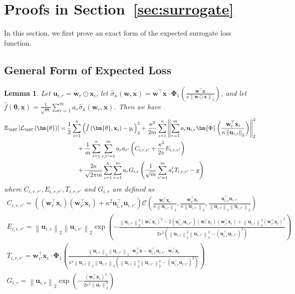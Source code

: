 \documentclass[10pt]{article} %
\newtheorem{lemma}[theorem]{Lemma}
\theoremstyle{definition}
\theoremstyle{plain}
\newcommand{\paren}[1]{\left(#1\right)}
\newcommand{\norm}[1]{\left\|#1\right\|}
\newcommand{\act}[2]{\hat{\sigma}_{\kappa}\paren{#1,#2}}
\providecommand{\E}{\mathbb{E}}
\def\calL{{\mathcal{L}}}
\def\bfu{{\mathbf{u}}}\def\bfv{{\mathbf{v}}}\def\bfw{{\mathbf{w}}}\def\bfx{{\mathbf{x}}}
\begin{document}
\section{Proofs in Section~\ref{sec:surrogate}}
In this section, we first prove an exact form of the expected surrogate loss function.
\subsection{General Form of Expected Loss}
\begin{lemma}
    \label{lem:exp_loss}
    Let $\bfu_{i,r} = \bfw_r\odot\bfx_i$, let $\act{\bfw}{\bfx} = \bfw^\top\bfx\cdot\bm{\Phi}_1\paren{\frac{\bfw^\top\bfx}{\kappa\norm{\bfw\odot\bfx}_2}}$, and let $\hat{f}\paren{\bm{\theta},\bfx} = \frac{1}{\sqrt{m}}\sum_{r=1}^ma_r\act{\bfw_r}{\bfx}$. Then we have
    \begin{align*}
        \E_{\bfC}\left[\calL_{\bfC}\paren{\bm{\theta}}\right] & = \frac{1}{2}\sum_{i=1}^n\paren{\hat{f}\paren{\bm{\theta},\bfx_i}-y_i}_2^2 + \frac{\kappa^2}{2m}\sum_{i=1}^n\norm{\sum_{r=1}^ma_r\bfu_{i,r}\bm{\Phi}\paren{\frac{\bfw_r^\top\bfx_i}{\kappa\norm{\bfu_{i,r}}_2}}}_2^2\\
        & \quad\quad\quad + \frac{1}{m}\sum_{i=1}^n\sum_{r,r'=1}^ma_ra_{r'}\paren{C_{i,r,r'} + \frac{\kappa^2}{2\pi}E_{i,r,r'}}\\
        & \quad\quad\quad + \frac{2\kappa}{\sqrt{2\pi m}}\sum_{i=1}^n\sum_{r=1}^ma_rG_{i,r}\paren{\frac{1}{\sqrt{m}}\sum_{r'=1}^ma_r'T_{i,r,r'} - y}
    \end{align*}
    where $C_{i,r,r'}, E_{i,r,r'}, T_{i,r,r'}$ and $G_{i,r}$ are defined as
    \begin{gather*}
        C_{i,r,r'} = \paren{\paren{\bfw_r^\top\bfx_i}\paren{\bfw_{r'}^\top\bfx_i} + \kappa^2\bfu_{i,r}^\top\bfu_{i,r'}}\mathcal{C}\paren{\frac{\bfw_r^\top\bfx_i}{\kappa\norm{\bfu_{i,r}}_2},\frac{\bfw_{r'}^\top\bfx_i}{\kappa\norm{\bfu_{i,r'}}_2},\frac{\bfu_{i,r}^\top\bfu_{i,r'}}{\norm{\bfu_{i,r}}_2\norm{\bfu_{i,r'}}_2}}\\
        E_{i,r,r'} = \norm{\bfu_{i,r}}_2\norm{\bfu_{i,r'}}_2\exp\paren{-\frac{\norm{\bfu_{i,r'}}_2^2\paren{\bfw_r^\top\bfx_i}^2-2\paren{\bfu_{i,r}^\top\bfu_{i,r'}}\paren{\bfw_r^\top\bfx_i}\paren{\bfw_{r'}^\top\bfx_i} + \norm{\bfu_{i,r}}_2^2\paren{\bfw_{r'}^\top\bfx_i}^2}{2\kappa^2\paren{\norm{\bfu_{i,r}}_2^2\norm{\bfu_{i,r'}}_2^2-\paren{\bfu_{i,r}^\top\bfu_{i,r'}}^2}}}\\
        T_{i,r,r'} = \bfw_{r'}^\top\bfx_i\cdot \bm{\Phi}_1\paren{\frac{\norm{\bfu_{i,r}}_2\norm{\bfu_{i,r'}}_2\cdot\bfw_{r'}^\top\bfx-\bfu_{i,r}^\top\bfu_{i,r'}\cdot\bfw_r^\top\bfx_i}{\kappa^2\norm{\bfu_{i,r}}_2\norm{\bfu_{i,r'}}_2\paren{\norm{\bfu_{i,r}}_2^2\norm{\bfu_{i,r'}}_2^2-\paren{\bfu_{i,r}^\top\bfu_{i,r'}}^2}}}\\
        G_{i,r} = \norm{\bfu_{i,r}}_2\exp\paren{-\frac{\paren{\bfw_r^\top\bfx_i}^2}{2\kappa^2\norm{\bfu_r}_2^2}}
    \end{gather*}
\end{lemma}
\end{document}
